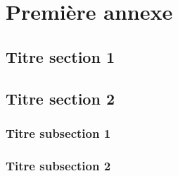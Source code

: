 \chapter{Première annexe}

\fancyhead[LE]{\textsc{\chaptername~\thechapter}}

\section{Titre section 1}

\lipsum[4] 

\lipsum[5] 

\section{Titre section 2}

\lipsum[6]

\subsection{Titre subsection 1}

\lipsum[7]

\lipsum[8]

\lipsum[13]

\subsection{Titre subsection 2}

\lipsum[9]

\lipsum[10]

\lipsum[12]
